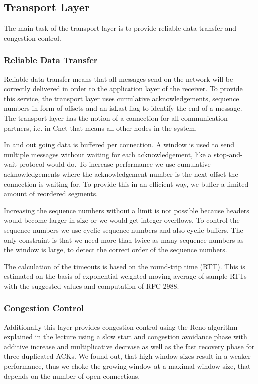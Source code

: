 \subsection{Transport Layer}
  The main task of the transport layer is to provide reliable data transfer and congestion control.

  \subsubsection{Reliable Data Transfer}
  Reliable data transfer means that all messages send on the network will be correctly delivered in order to the application layer of the receiver. To provide this service, the transport layer uses cumulative acknowledgements, sequence numbers in form of offsets and an isLast flag to identify the end of a message. The transport layer has the notion of a connection for all communication partners, i.e. in Cnet that means all other nodes in the system.
  
  In and out going data is buffered per connection. A window is used to send multiple messages without waiting for each acknowledgement, like a stop-and-wait protocol would do. To increase performance we use cumulative acknowledgements where the acknowledgement number is the next offset the connection is waiting for. To provide this in an efficient way, we buffer a limited amount of reordered segments.
  
  Increasing the sequence numbers without a limit is not possible because headers would become larger in size or we would get integer overflows. To control the sequence numbers we use cyclic sequence numbers and also cyclic buffers. The only constraint is that we need more than twice as many sequence numbers as the window is large, to detect the correct order of the sequence numbers.
  
  The calculation of the timeouts is based on the round-trip time (RTT). This is estimated on the basis of exponential weighted moving average of sample RTTs with the suggested values and computation of RFC 2988.
  
  \subsubsection{Congestion Control}
  Additionally this layer provides congestion control using the Reno algorithm explained in the lecture using a slow start and congestion avoidance phase with additive increase and multiplicative decrease as well as the fast recovery phase for three duplicated ACKs. We found out, that high window sizes result in a weaker performance, thus we choke the growing window at a maximal window size, that depends on the number of open connections.
  
